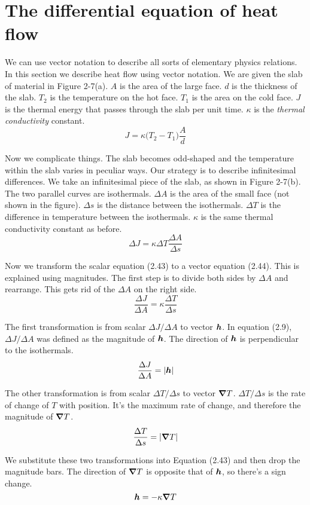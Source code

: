 \section{The differential equation of heat flow}

We can use vector notation to describe all sorts of elementary physics relations.
In this section we describe heat flow using vector notation.
We are given the slab of material in Figure 2-7(a).
$A$ is the area of the large face.
$d$ is the thickness of the slab.
$T_2$ is the temperature on the hot face.
$T_1$ is the area on the cold face.
$J$ is the thermal energy that passes through the slab per unit time.
$\kappa$ is the \emph{thermal conductivity} constant.
\begin{equation}
  J = \kappa \big( T_2 - T_1 \big) \frac{A}{d}
\end{equation}

Now we complicate things.
The slab becomes odd-shaped and the temperature within the slab
varies in peculiar ways.
Our strategy is to describe infinitesimal differences.
We take an infinitesimal piece of the slab, as shown in Figure 2-7(b).
The two parallel curves are isothermals.
$\Delta A$ is the area of the small face (not shown in the figure).
$\Delta s$ is the distance between the isothermals.
$\Delta T$ is the difference in temperature between the isothermals.
$\kappa$ is the same thermal conductivity constant as before.
\begin{equation}
  \Delta J = \kappa \Delta T \frac{\Delta A}{\Delta s}
\end{equation}

\newpage
Now we transform the scalar equation (2.43) to a vector equation (2.44).
This is explained using magnitudes.
The first step is to divide both sides by $\Delta A$ and rearrange.
This gets rid of the $\Delta A$ on the right side.
\begin{equation*}
  \frac{\Delta J}{\Delta A} = \kappa \frac{\Delta T}{\Delta s}
\end{equation*}

The first transformation is from scalar $\Delta J / \Delta A$ to vector $\boldsymbol{h}$.
In equation (2.9), $\Delta J / \Delta A$ was defined as the magnitude of $\boldsymbol{h}$.
The direction of $\boldsymbol{h}$ is perpendicular to the isothermals.
\begin{equation*}
  \frac{\Delta J}{\Delta A} = | \boldsymbol{h} |
\end{equation*}

The other transformation is from scalar $\Delta T / \Delta s$ to vector $\boldsymbol{\nabla} T$.
$\Delta T / \Delta s$ is the rate of change of $T$ with position.
It's the maximum rate of change, and therefore the magnitude of $\boldsymbol{\nabla} T$.
\begin{equation*}
  \frac{\Delta T}{\Delta s} = | \boldsymbol{\nabla} T |
\end{equation*}

We substitute these two transformations into Equation (2.43) and then drop the magnitude bars.
The direction of $\boldsymbol{\nabla} T$ is opposite that of $\boldsymbol{h}$, so there's a sign change.
\begin{equation}
  \boldsymbol{h} = - \kappa \boldsymbol{\nabla} T
\end{equation}


